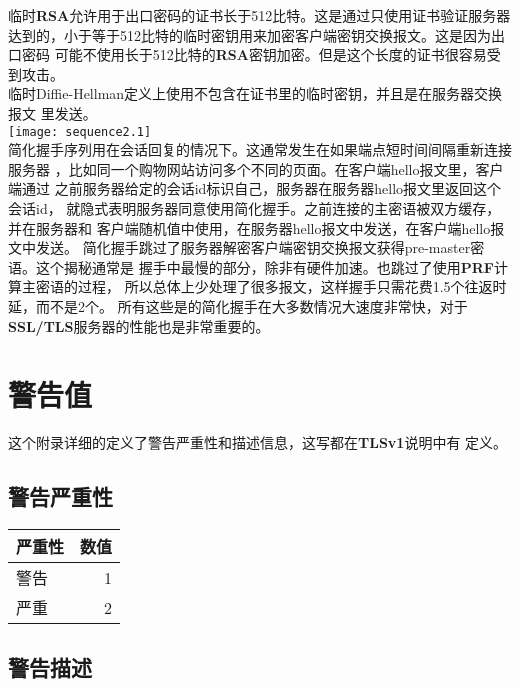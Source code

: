 \documentclass[11pt]{article}
\newcommand{\bfs}[1]{{\bf{#1}}}
\begin{document}
临时\bfs{RSA}允许用于出口密码的证书长于512比特。这是通过只使用证书验证服务器
达到的，小于等于512比特的临时密钥用来加密客户端密钥交换报文。这是因为出口密码
可能不使用长于512比特的\bfs{RSA}密钥加密。但是这个长度的证书很容易受到攻击。\\

临时Diffie-Hellman定义上使用不包含在证书里的临时密钥，并且是在服务器交换报文
里发送。\\

\texttt{[image: sequence2.1]}
\\

简化握手序列用在会话回复的情况下。这通常发生在如果端点短时间间隔重新连接服务器
，比如同一个购物网站访问多个不同的页面。在客户端hello报文里，客户端通过
之前服务器给定的会话id标识自己，服务器在服务器hello报文里返回这个会话id，
就隐式表明服务器同意使用简化握手。之前连接的主密语被双方缓存，并在服务器和
客户端随机值中使用，在服务器hello报文中发送，在客户端hello报文中发送。
简化握手跳过了服务器解密客户端密钥交换报文获得pre-master密语。这个揭秘通常是
握手中最慢的部分，除非有硬件加速。也跳过了使用\bfs{PRF}计算主密语的过程，
所以总体上少处理了很多报文，这样握手只需花费1.5个往返时延，而不是2个。
所有这些是的简化握手在大多数情况大速度非常快，对于\bfs{SSL/TLS}服务器的性能也是非常重要的。





\pagebreak
\appendix
\section{警告值}

这个附录详细的定义了警告严重性和描述信息，这写都在\bfs{TLSv1}说明中有
定义。\\

\subsection{警告严重性}
\begin{center}
\begin{tabular}{|l|r|}
        \hline
        严重性&数值\\
        \hline
           警告&1\\
           严重&2\\
        \hline
\end{tabular}
\end{center}

\subsection{警告描述}
\end{document}
